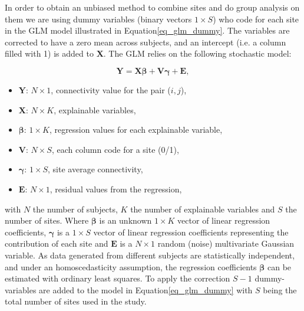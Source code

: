 \documentclass[authoryear]{elsarticle}
\begin{document}
In order to obtain an unbiased method to combine sites and do group analysis on them we are using dummy variables (binary vectors $1\times S$) who code for each site in the GLM model illustrated in Equation\ref{eq_glm_dummy}. The variables are corrected to have a zero mean across subjects, and an intercept (i.e. a column filled with 1) is added to $\mathbf{X}$. The GLM relies on the following stochastic model:

\begin{equation}
 \label{eq_glm_dummy}
  \mathbf{Y} = \mathbf{X}\mathbf{\beta} + \mathbf{V}\mathbf{\gamma}+ \mathbf{E},
\end{equation}
\begin{itemize}
  \item $\mathbf{Y}$: $N\times 1$, connectivity value for the pair ($i,j$),
  \item $\mathbf{X}$: $N\times K$, explainable variables,
  \item $\mathbf{\beta}$: $1 \times K$, regression values for each explainable variable,
  \item $\mathbf{V}$: $N\times S$, each column code for a site (0/1),
  \item $\mathbf{\gamma}$: $1\times S$, site average connectivity,
  \item $\mathbf{E}$: $N\times 1$, residual values from the regression,
\end{itemize}
 
with $N$ the number of subjects, $K$ the number of explainable variables and $S$ the number of sites. Where $\mathbf{\beta}$ is an unknown $1\times K$ vector of linear regression coefficients, $\mathbf{\gamma}$ is a $1\times S$ vector of linear regression coefficients representing the contribution of each site and $\mathbf{E}$ is a $N\times 1$ random (noise) multivariate Gaussian variable. As data generated from different subjects are statistically independent, and under an homoscedasticity assumption, the regression coefficients $\mathbf{\beta}$ can be estimated with ordinary least squares. To apply the correction $S-1$ dummy-variables are added to the model in Equation\ref{eq_glm_dummy} with $S$ being the total number of sites used in the study.
\end{document}

